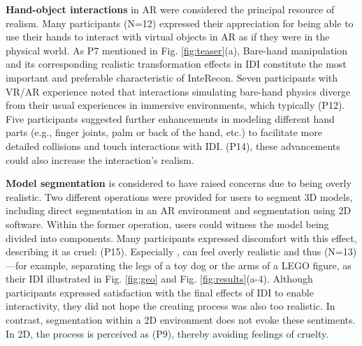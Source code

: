 \textbf{Hand-object interactions} in AR were considered the principal resource of realism. 
Many participants (N=12) expressed their appreciation for being able to use their hands to interact with virtual objects in AR as if they were in the physical world. 
As P7 mentioned in Fig. \ref{fig:teaser}(a),  
Bare-hand manipulation and its corresponding realistic transformation effects in IDI constitute the most important and preferable characteristic of InteRecon.
Seven participants with VR/AR experience noted that interactions simulating bare-hand physics diverge from their usual experiences in immersive environments, which typically  (P12).
Five participants suggested further enhancements in modeling different hand parts (e.g., finger joints, palm or back of the hand, etc.) to facilitate more detailed collisions and touch interactions with IDI.
 (P14), these advancements could also increase the interaction's realism.

\textbf{Model segmentation} is considered to have raised concerns due to being overly realistic.
Two different operations were provided for users to segment 3D models, including direct segmentation in an AR environment and segmentation using 2D software.
Within the former operation, users could witness the model being divided into components. 
Many participants expressed discomfort with this effect, describing it as cruel:  (P15).
Especially , can feel overly realistic and thus  (N=13)—for example, separating the legs of a toy dog or the arms of a LEGO figure, as their IDI illustrated in Fig. \ref{fig:geo} and Fig. \ref{fig:results}(a-4). 
Although participants expressed satisfaction with the final effects of IDI to enable interactivity, they did not hope the creating process was also too realistic.  
In contrast, segmentation within a 2D environment does not evoke these sentiments. 
In 2D, the process is perceived as  (P9), thereby avoiding feelings of cruelty.





